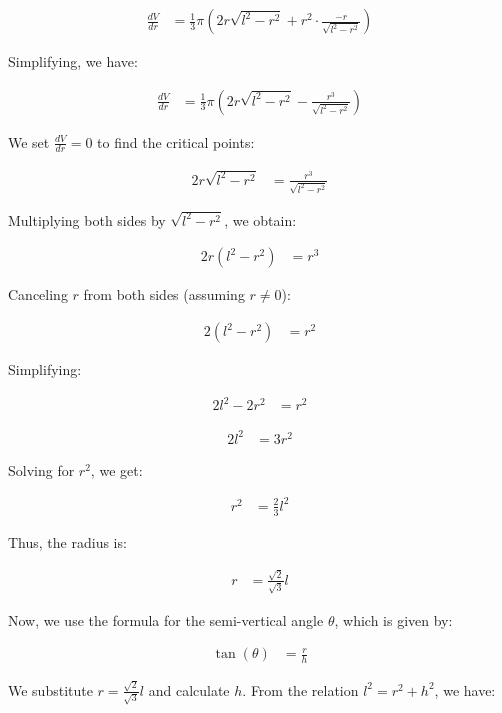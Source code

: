 \documentclass[journal]{IEEEtran}
\begin{document}
\begin{align}
\frac{dV}{dr} &= \frac{1}{3} \pi \left( 2r \sqrt{l^2 - r^2} + r^2 \cdot \frac{-r}{\sqrt{l^2 - r^2}} \right)
\end{align}

Simplifying, we have:

\begin{align}
\frac{dV}{dr} &= \frac{1}{3} \pi \left( 2r \sqrt{l^2 - r^2} - \frac{r^3}{\sqrt{l^2 - r^2}} \right)
\end{align}

We set \( \frac{dV}{dr} = 0 \) to find the critical points:

\begin{align}
2r \sqrt{l^2 - r^2} &= \frac{r^3}{\sqrt{l^2 - r^2}}
\end{align}

Multiplying both sides by \( \sqrt{l^2 - r^2} \), we obtain:

\begin{align}
2r (l^2 - r^2) &= r^3
\end{align}

Canceling \( r \) from both sides (assuming \( r \neq 0 \)):

\begin{align}
2(l^2 - r^2) &= r^2
\end{align}

Simplifying:

\begin{align}
2l^2 - 2r^2 &= r^2
\end{align}

\begin{align}
2l^2 &= 3r^2
\end{align}

Solving for \( r^2 \), we get:

\begin{align}
r^2 &= \frac{2}{3} l^2
\end{align}

Thus, the radius is:

\begin{align}
r &= \frac{\sqrt{2}}{\sqrt{3}} l
\end{align}

Now, we use the formula for the semi-vertical angle \( \theta \), which is given by:

\begin{align}
\tan(\theta) &= \frac{r}{h}
\end{align}

We substitute \( r = \frac{\sqrt{2}}{\sqrt{3}} l \) and calculate \( h \). From the relation \( l^2 = r^2 + h^2 \), we have:
\end{document}
